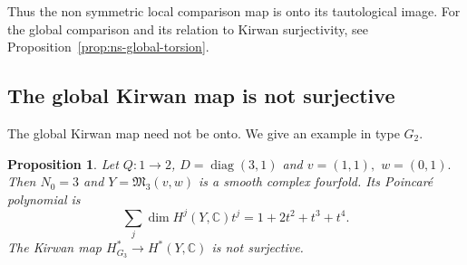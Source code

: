 \documentclass[11pt,reqno]{amsart}
\newtheorem{Proposition}[Theorem]{Proposition}
\theoremstyle{definition}
\theoremstyle{remark}
\def\bbC{\mathbb C}
\begin{document}
Thus the non symmetric local comparison map is onto its tautological image.
For the global comparison and its relation to Kirwan
surjectivity, see Proposition~\ref{prop:ns-global-torsion}.


















\subsection{The global Kirwan map is not surjective}
\label{subsec:G2-global-kirwan}
The global Kirwan map need not be onto.
We give an example in type $G_2$. 

\begin{Proposition}\label{prop:G2-global-kirwan}
Let $Q:1\to 2$, $D=\operatorname{diag}(3,1)$ and
$v=(1,1),$ $w=(0,1).$
Then $N_0=3$ and $Y=\mathfrak M_3(v,w)$ is a smooth complex
fourfold. Its Poincar\'e polynomial is
\[
 \sum_j\dim H^j(Y,\bbC)t^j=1+2t^2+t^3+t^4.
\]
The Kirwan map
$H^*_{G_3}\longrightarrow H^*(Y,\bbC)$
is not surjective. \end{Proposition}
\end{document}
